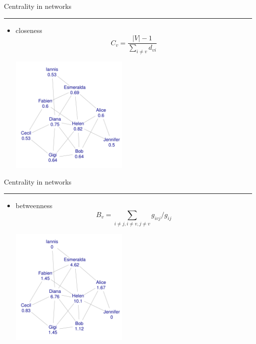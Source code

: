 \documentclass[landscape,fleqno]{foils}
\newcommand{\stitle}[1]{{\color{blue}\Large #1\par\vspace*{10pt}\hrule}}
\newenvironment{narrow}[2]{%
  \begin{list}{}{%
      \setlength{\topsep}{0pt}%
      \setlength{\leftmargin}{#1}%
      \setlength{\rightmargin}{#2}%
      \setlength{\listparindent}{\parindent}%
      \setlength{\itemindent}{\parindent}%
      \setlength{\parsep}{\parskip}}%
    \item[]}{\end{list}}
\begin{document}
\newpage
\stitle{Centrality in networks}
\begin{narrow}{0cm}{15cm}
\begin{itemize}
\item closeness
  \[ C_v = \frac{|V|-1}{\sum_{i\ne v} d_{vi}} \]
\begin{center}
\includegraphics[width=0.45\textwidth]{ex-close}
\end{center}
\end{itemize}
\end{narrow}

\newpage
\stitle{Centrality in networks}
\begin{narrow}{0cm}{15cm}
\begin{itemize}
\item betweenness
  \[ B_v= \sum_{i\ne j, i\ne v, j\ne v} g_{ivj}/g_{ij} \]
\begin{center}
\includegraphics[width=0.45\textwidth]{ex-betw}
\end{center}
\end{itemize}
\end{narrow}
\end{document}
